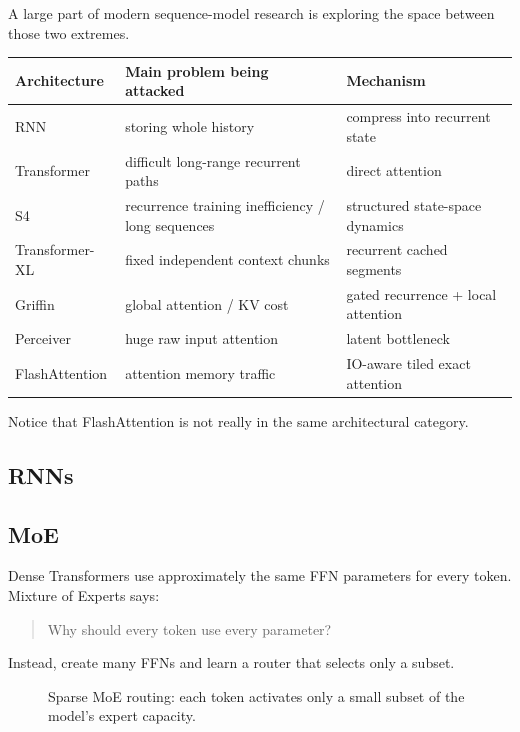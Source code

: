 A large part of modern sequence-model research is exploring the space between those two extremes.
\begin{center}
\small
\begin{tabularx}{.96\linewidth}{@{}L{.18\linewidth}YY@{}}
\toprule
\textbf{Architecture} & \textbf{Main problem being attacked} & \textbf{Mechanism} \\
\midrule
RNN & storing whole history & compress into recurrent state \\
Transformer & difficult long-range recurrent paths & direct attention \\
S4 & recurrence training inefficiency / long sequences & structured state-space dynamics \\
Transformer-XL & fixed independent context chunks & recurrent cached segments \\
Griffin & global attention / KV cost & gated recurrence + local attention \\
Perceiver & huge raw input attention & latent bottleneck \\
FlashAttention & attention memory traffic & IO-aware tiled exact attention \\
\bottomrule
\end{tabularx}
\end{center}

Notice that FlashAttention is not really in the same architectural category.
\subsection{RNNs}
\subsection{MoE}
Dense Transformers use approximately the same FFN parameters for every token.
Mixture of Experts says:

\begin{quote}
Why should every token use every parameter?
\end{quote}

Instead, create many FFNs and learn a router that selects only a subset.

\begin{figure}[htbp]
\centering
{}
\caption{Sparse MoE routing: each token activates only a small subset of the model's expert capacity.}
\label{fig:modern-moe-router}
\end{figure}


